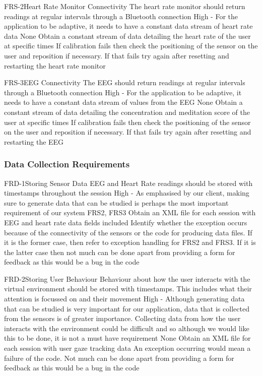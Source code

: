 \documentclass[coverpage,lineno]{../custom}
\begin{document}
\FunctionalReq
{FRS-2}{Heart Rate Monitor Connectivity}
{The heart rate monitor should return readings at regular intervals through a Bluetooth connection}
{High - \musthave}
{For the application to be adaptive, it needs to have a constant data stream of heart rate data}
{None}
{Obtain a constant stream of data detailing the heart rate of the user at specific times}
{If calibration fails then check the positioning of the sensor on the user and reposition if necessary. If that fails try again after resetting and restarting the heart rate monitor}

\FunctionalReq
{FRS-3}{EEG Connectivity}
{The EEG should return readings at regular intervals through a Bluetooth connection}
{High - \musthave}
{For the application to be adaptive, it needs to have a constant data stream of values from the EEG}
{None}
{Obtain a constant stream of data detailing the concentration and meditation score of the user at specific times}
{If calibration fails then check the positioning of the sensor on the user and reposition if necessary. If that fails try again after resetting and restarting the EEG}

\subsubsection{Data Collection Requirements}

\FunctionalReq
{FRD-1}{Storing Sensor Data}
{EEG and Heart Rate readings should be stored with timestamps throughout the session}
{High - \musthave}
{As emphasised by our client, making sure to generate data that can be studied is perhaps the most important requirement of our system}
{FRS2, FRS3}
{Obtain an XML file for each session with EEG and heart rate data fields included}
{Identify whether the exception occurs because of the connectivity of the sensors or the code for producing data files. If it is the former case, then refer to exception handling for FRS2 and FRS3. If it is the latter case then not much can be done apart from providing a form for feedback as this would be a bug in the code}

\FunctionalReq
{FRD-2}{Storing User Behaviour}
{Behaviour about how the user interacts with the virtual environment should be stored with timestamps. This includes what their attention is focussed on and their movement}
{High - \shouldhave}
{Although generating data that can be studied is very important for our application, data that is collected from the sensors is of greater importance. Collecting data from how the user interacts with the environment could be difficult and so although we would like this to be done, it is not a must have requirement}
{None}
{Obtain an XML file for each session with user gaze tracking data}
{An exception occurring would mean a failure of the code. Not much can be done apart from providing a form for feedback as this would be a bug in the code}
\end{document}
